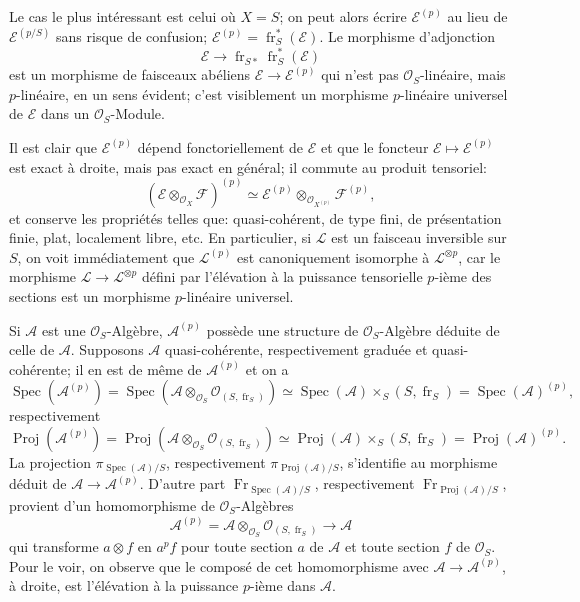 \documentclass[11pt]{article}
\DeclareMathOperator{\Spec}{Spec}
\providecommand{\OO}{\mathcal{O}}
\providecommand{\cE}{\mathcal E}
\providecommand{\cF}{\mathcal F}
\providecommand{\Spec}{\operatorname{Spec}}
\providecommand{\Spec}{\operatorname{Spec}}
\providecommand{\Spec}{\operatorname{Spec}}
\providecommand{\fr}{\operatorname{fr}}
\providecommand{\Fr}{\operatorname{Fr}}
\providecommand{\Proj}{\operatorname{Proj}}
\providecommand{\cL}{\mathcal L}
\providecommand{\Fr}{\operatorname{Fr}}
\providecommand{\fr}{\operatorname{fr}}
\providecommand{\Spec}{\operatorname{Spec}}
\begin{document}
Le cas le plus intéressant est celui où $X=S$; on peut alors écrire $\cE^{(p)}$ au lieu de $\cE^{(p/S)}$ sans risque de confusion; $\cE^{(p)}=\fr_S^*(\cE)$. Le morphisme d'adjonction
\[
\cE\longrightarrow \fr_{S*}\fr_S^*(\cE)
\]
est un morphisme de faisceaux abéliens $\cE\to\cE^{(p)}$ qui n'est pas $\OO_S$-linéaire, mais $p$-linéaire, en un sens évident; c'est visiblement un morphisme $p$-linéaire universel de $\cE$ dans un $\OO_S$-Module.

Il est clair que $\cE^{(p)}$ dépend fonctoriellement de $\cE$ et que le foncteur $\cE\mapsto\cE^{(p)}$ est exact à droite, mais pas exact en général; il commute au produit tensoriel:
\[
(\cE\otimes_{\OO_X}\cF)^{(p)}\simeq
\cE^{(p)}\otimes_{\OO_{X^{(p)}}}\cF^{(p)},
\]
et conserve les propriétés telles que: quasi-cohérent, de type fini, de présentation finie, plat, localement libre, etc. En particulier, si $\cL$ est un faisceau inversible sur $S$, on voit immédiatement que $\cL^{(p)}$ est canoniquement isomorphe à $\cL^{\otimes p}$, car le morphisme $\cL\to\cL^{\otimes p}$ défini par l'élévation à la puissance tensorielle $p$-ième des sections est un morphisme $p$-linéaire universel.

Si $\mathcal{A}$ est une $\OO_S$-Algèbre, $\mathcal{A}^{(p)}$ possède une structure de $\OO_S$-Algèbre déduite de celle de $\mathcal{A}$. Supposons $\mathcal{A}$ quasi-cohérente, respectivement graduée et quasi-cohérente; il en est de même de $\mathcal{A}^{(p)}$ et on a
\[
\Spec(\mathcal{A}^{(p)})=\Spec(\mathcal{A}\otimes_{\OO_S}\OO_{(S,\fr_S)})
 \simeq \Spec(\mathcal{A})\times_S(S,\fr_S)=\Spec(\mathcal{A})^{(p)},
\]
respectivement
\[
\Proj(\mathcal{A}^{(p)})=\Proj(\mathcal{A}\otimes_{\OO_S}\OO_{(S,\fr_S)})
 \simeq \Proj(\mathcal{A})\times_S(S,\fr_S)=\Proj(\mathcal{A})^{(p)}.
\]
La projection $\pi_{\Spec(\mathcal{A})/S}$, respectivement $\pi_{\Proj(\mathcal{A})/S}$, s'identifie au morphisme déduit de $\mathcal{A}\to\mathcal{A}^{(p)}$. D'autre part $\Fr_{\Spec(\mathcal{A})/S}$, respectivement $\Fr_{\Proj(\mathcal{A})/S}$, provient d'un homomorphisme de $\OO_S$-Algèbres
\[
\mathcal{A}^{(p)}=\mathcal{A}\otimes_{\OO_S}\OO_{(S,\fr_S)}\longrightarrow \mathcal{A}
\]
qui transforme $a\otimes f$ en $a^p f$ pour toute section $a$ de $\mathcal{A}$ et toute section $f$ de $\OO_S$. Pour le voir, on observe que le composé de cet homomorphisme avec $\mathcal{A}\to\mathcal{A}^{(p)}$, à droite, est l'élévation à la puissance $p$-ième dans $\mathcal{A}$.
\end{document}
